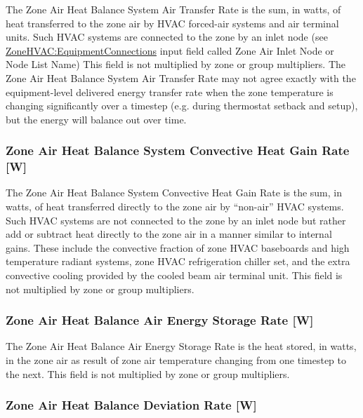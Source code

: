 The Zone Air Heat Balance System Air Transfer Rate is the sum, in watts, of heat transferred to the zone air by HVAC forced-air systems and air terminal units. Such HVAC systems are connected to the zone by an inlet node (see \hyperref[zonehvacequipmentconnections]{ZoneHVAC:EquipmentConnections} input field called Zone Air Inlet Node or Node List Name) This field is not multiplied by zone or group multipliers. The Zone Air Heat Balance System Air Transfer Rate may not agree exactly with the equipment-level delivered energy transfer rate when the zone temperature is changing significantly over a timestep (e.g. during thermostat setback and setup), but the energy will balance out over time.

\subsubsection{Zone Air Heat Balance System Convective Heat Gain Rate {[}W{]}}\label{zone-air-heat-balance-system-convective-heat-gain-rate-w}

The Zone Air Heat Balance System Convective Heat Gain Rate is the sum, in watts, of heat transferred directly to the zone air by ``non-air'' HVAC systems. Such HVAC systems are not connected to the zone by an inlet node but rather add or subtract heat directly to the zone air in a manner similar to internal gains. These include the convective fraction of zone HVAC baseboards and high temperature radiant systems, zone HVAC refrigeration chiller set, and the extra convective cooling provided by the cooled beam air terminal unit. This field is not multiplied by zone or group multipliers.

\subsubsection{Zone Air Heat Balance Air Energy Storage Rate {[}W{]}}\label{zone-air-heat-balance-air-energy-storage-rate-w}

The Zone Air Heat Balance Air Energy Storage Rate is the heat stored, in watts, in the zone air as result of zone air temperature changing from one timestep to the next. This field is not multiplied by zone or group multipliers.

\subsubsection{Zone Air Heat Balance Deviation Rate {[}W{]}}\label{zone-air-heat-balance-deviation-rate-w}

